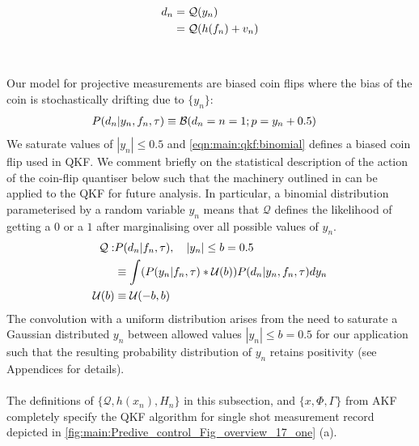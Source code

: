 \begin{align}
d_n &= \mathcal{Q}(y_n)\\
&=  \mathcal{Q}(h(f_n) + v_n)
\end{align}
\\
\\ 
Our model for projective measurements are biased coin flips where the bias of the coin is stochastically drifting due to $\{ y_n\}$:
\begin{align}
P(d_n | y_n, f_{n}, \tau) & \equiv \mathcal{B}(d_n=n=1;p= y_n + 0.5 ) \label{eqn:main:qkf:binomial}
\end{align}
We saturate values of $|y_n| \leq 0.5$ and \cref{eqn:main:qkf:binomial} defines a biased coin flip used in QKF. We comment briefly on the statistical description of the action of the coin-flip quantiser below such that the machinery outlined in \cite{karlsson2005} can be applied to the QKF for future analysis. In particular, a binomial distribution parameterised by a random variable $y_n$ means that $\mathcal{Q}$ defines the likelihood of getting a $0$ or a $1$ after marginalising over all possible values of $y_n$.  
\begin{align}
\mathcal{Q}: & P(d_n | f_{n}, \tau), \quad |y_n| \leq b = 0.5\\
& \equiv  \int (P(y_n | f_{n}, \tau) * \mathcal{U}(b) ) P(d_n | y_n, f_{n}, \tau) dy_n \\
\mathcal{U}(b) & \equiv \mathcal{U}(-b, b)
\end{align}
The convolution with a uniform distribution arises from the need to saturate a Gaussian distributed  $y_n$ between allowed values $|y_n| \leq b = 0.5$ for our application such that the resulting probability distribution of $y_n$ retains positivity (see Appendices for details). 
\\
\\
The definitions of $\{ \mathcal{Q}, h(x_n), H_n \}$ in this subsection, and $\{x, \Phi, \Gamma\}$ from AKF completely specify the QKF algorithm for single shot measurement record depicted in \cref{fig:main:Predive_control_Fig_overview_17_one} (a).  
\\
\\
